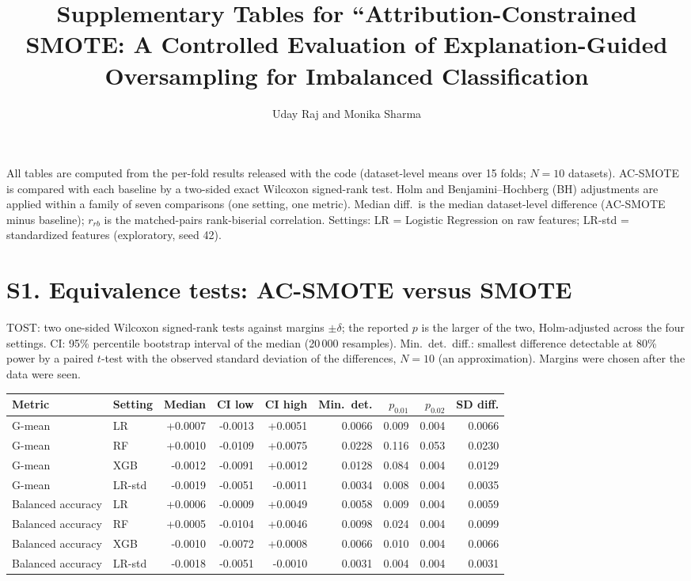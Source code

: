 \documentclass[10pt,a4paper]{article}
\begin{document}
\title{Supplementary Tables for ``Attribution-Constrained SMOTE: A Controlled Evaluation of Explanation-Guided Oversampling for Imbalanced Classification}
\author{Uday Raj and Monika Sharma}\date{}\maketitle
\noindent All tables are computed from the per-fold results released with the code (dataset-level means over 15 folds; $N=10$ datasets). AC-SMOTE is compared with each baseline by a two-sided exact Wilcoxon signed-rank test. Holm and Benjamini--Hochberg (BH) adjustments are applied within a family of seven comparisons (one setting, one metric). Median diff.\ is the median dataset-level difference (AC-SMOTE minus baseline); $r_{rb}$ is the matched-pairs rank-biserial correlation. Settings: LR = Logistic Regression on raw features; LR-std = standardized features (exploratory, seed 42).
\section*{S1. Equivalence tests: AC-SMOTE versus SMOTE}
\noindent TOST: two one-sided Wilcoxon signed-rank tests against margins $\pm\delta$; the reported $p$ is the larger of the two, Holm-adjusted across the four settings. CI: 95\% percentile bootstrap interval of the median (20\,000 resamples). Min.\ det.\ diff.: smallest difference detectable at 80\% power by a paired $t$-test with the observed standard deviation of the differences, $N=10$ (an approximation). Margins were chosen after the data were seen.
\begin{center}\small\begin{tabular}{@{}llrrrrrrr@{}}\toprule Metric & Setting & Median & CI low & CI high & Min.\ det. & $p_{0.01}$ & $p_{0.02}$ & SD diff. \\ \midrule
G-mean & LR & +0.0007 & -0.0013 & +0.0051 & 0.0066 & 0.009 & 0.004 & 0.0066 \\
G-mean & RF & +0.0010 & -0.0109 & +0.0075 & 0.0228 & 0.116 & 0.053 & 0.0230 \\
G-mean & XGB & -0.0012 & -0.0091 & +0.0012 & 0.0128 & 0.084 & 0.004 & 0.0129 \\
G-mean & LR-std & -0.0019 & -0.0051 & -0.0011 & 0.0034 & 0.008 & 0.004 & 0.0035 \\
Balanced accuracy & LR & +0.0006 & -0.0009 & +0.0049 & 0.0058 & 0.009 & 0.004 & 0.0059 \\
Balanced accuracy & RF & +0.0005 & -0.0104 & +0.0046 & 0.0098 & 0.024 & 0.004 & 0.0099 \\
Balanced accuracy & XGB & -0.0010 & -0.0072 & +0.0008 & 0.0066 & 0.010 & 0.004 & 0.0066 \\
Balanced accuracy & LR-std & -0.0018 & -0.0051 & -0.0010 & 0.0031 & 0.004 & 0.004 & 0.0031 \\
\bottomrule\end{tabular}\end{center}
\end{document}
